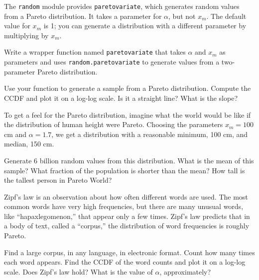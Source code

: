 \documentclass[12pt]{book}
\begin{document}
\begin{ex}

The {\tt random} module provides {\tt paretovariate},
which generates random values from a Pareto distribution.  It takes
a parameter for $\alpha$, but not $x_m$.  The
default value for $x_m$ is 1; you can generate a distribution
with a different parameter by multiplying by $x_m$.


Write a wrapper function named {\tt paretovariate} that takes $\alpha$
and $x_m$ as parameters and uses {\tt random.paretovariate} to
generate values from a two-parameter Pareto distribution.


Use your function to generate a sample from a Pareto distribution.
Compute the CCDF and plot it on a log-log scale.  Is it a straight
line?  What is the slope?


\end{ex}

\begin{ex}

To get a feel for the Pareto distribution, imagine what the world
would be like if the distribution of human height were Pareto.
Choosing the parameters $x_m = 100$ cm and $\alpha = 1.7$, we
get a distribution with a reasonable minimum, 100 cm,
and median, 150 cm.


Generate 6 billion random values from this distribution.  What is the
mean of this sample?  What fraction of the population is shorter than
the mean?  How tall is the tallest person in Pareto World?


\end{ex}

\begin{ex}

Zipf's law is an observation about how often different words are used.
The most common words have very high frequencies, but there are many
unusual words, like ``hapaxlegomenon,'' that appear only a few times.
Zipf's law predicts that in a body of text, called a ``corpus,'' the
distribution of word frequencies is roughly Pareto.


Find a large corpus, in any language, in electronic
format.  Count how many times each word appears.  Find the CCDF of the
word counts and plot it on a log-log scale.  Does Zipf's law hold?
What is the value of $\alpha$, approximately?


\end{ex}
\end{document}
